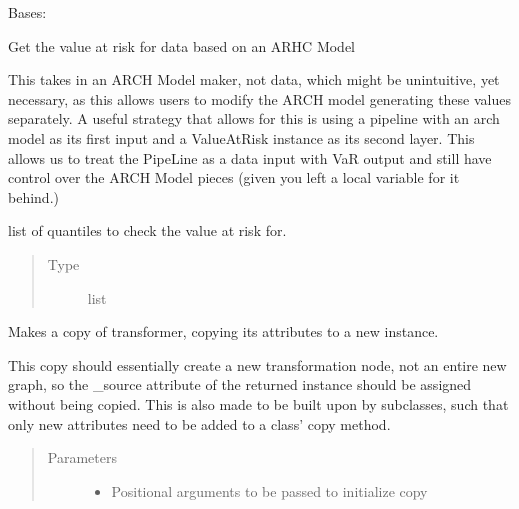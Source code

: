 \documentclass[letterpaper,10pt,english]{sphinxmanual}
\begin{document}
\begin{fulllineitems}
\label{\detokenize{dalio.pipe:dalio.pipe.ValueAtRisk}}
Bases: {\hyperref[\detokenize{dalio.pipe:dalio.pipe.pipe.Pipe}]{}}

Get the value at risk for data based on an ARHC Model

This takes in an ARCH Model maker, not data, which might be unintuitive,
yet necessary, as this allows users to modify the ARCH model generating
these values separately. A useful strategy that allows for this
is using a pipeline with an arch model as its first input and a
ValueAtRisk instance as its second layer. This allows us to treat the
PipeLine as a data input with VaR output and still have control over the
ARCH Model pieces (given you left a local variable for it behind.)

\begin{fulllineitems}
\label{\detokenize{dalio.pipe:dalio.pipe.ValueAtRisk._quantiles}}
list of quantiles to check the value at risk for.
\begin{quote}\begin{description}
\item[{Type}] \leavevmode
list

\end{description}\end{quote}

\end{fulllineitems}


\begin{fulllineitems}
\label{\detokenize{dalio.pipe:dalio.pipe.ValueAtRisk.copy}}
Makes a copy of transformer, copying its attributes to a new
instance.

This copy should essentially create a new transformation node, not an
entire new graph, so the \_source attribute of the returned instance
should be assigned without being copied. This is also made to be built
upon by subclasses, such that only new attributes need to be added to
a class’ copy method.
\begin{quote}\begin{description}
\item[{Parameters}] \leavevmode\begin{itemize}
\item {} 
 \textendash{} Positional arguments to be passed to initialize copy


\end{itemize}
\end{description}
\end{quote}
\end{fulllineitems}
\end{fulllineitems}
\end{document}
